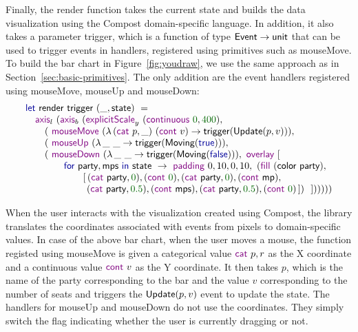 \documentclass{jfp}
\newcommand{\num}[1]{\textcolor{numclr}{#1}}
\newcommand{\ident}[1]{\textnormal{\textcolor{idclr}{\sffamily #1}}}
\newcommand{\kvd}[1]{\textnormal{\textcolor{kvdclr}{\sffamily #1}}}
\newcommand{\fkvd}[1]{\textnormal{\textcolor{fkvdclr}{\sffamily #1}}}
\begin{document}
Finally, the \ident{render} function takes the current state and builds the data visualization
using the Compost domain-specific language. In addition, it also takes a parameter \ident{trigger},
which is a function of type $\ident{Event}\rightarrow\ident{unit}$ that can be used to trigger
events in handlers, registered using primitives such as \kvd{mouseMove}.
To build the bar chart in Figure~\ref{fig:youdraw}, we use the same approach as in
Section~\ref{sec:basic-primitives}. The only addition are the event handlers registered using
\kvd{mouseMove}, \kvd{mouseUp} and \kvd{mouseDown}:
%
\begin{equation*}
\begin{array}{l}
\fkvd{let}~\ident{render}~\ident{trigger}~(\_, \ident{state})~=\\
\quad \kvd{axis}_l~(\kvd{axis}_b~(\kvd{explicitScale}_y~(\kvd{continuous}~\num{0},\num{400}),\\
\qquad (~\kvd{mouseMove}~(\lambda \,(\kvd{cat}~p,\_)~(\kvd{cont}~v)\rightarrow \ident{trigger}(\ident{Update}(p, v))),\\
\qquad (~\kvd{mouseUp}~(\lambda \,\_~\_\rightarrow \ident{trigger}(\ident{Moving}(\fkvd{true}))),\\
\qquad (~\kvd{mouseDown}~(\lambda \,\_~\_\rightarrow \ident{trigger}(\ident{Moving}(\fkvd{false}))),~\kvd{overlay}~[\\
\qquad \qquad \fkvd{for}~\ident{party}, \ident{mps}~\fkvd{in}~\ident{state}~\rightarrow~\kvd{padding}~0,10,0,10,~(\kvd{fill}~(\ident{color}~\ident{party}),\\
\qquad \qquad\quad\quad [\,(\kvd{cat}~\ident{party}, \num{0}), (\kvd{cont}~\num{0}), (\kvd{cat}~\ident{party}, \num{0}), (\kvd{cont}~\ident{mp}),\\
\qquad \qquad\quad\quad \hspace{0.38em}(\kvd{cat}~\ident{party}, \num{0.5}), (\kvd{cont}~\ident{mps}), (\kvd{cat}~\ident{party}, \num{0.5}), (\kvd{cont}~\num{0}) \,])~~])))))\\
\end{array}
\end{equation*}

\vspace{-0.5em}
\noindent
When the user interacts with the visualization created using Compost, the library
translates the coordinates associated with events from pixels to domain-specific
values. In case of the above bar chart, when the user moves a mouse, the function registed
using \kvd{mouseMove} is given a categorical value $\kvd{cat}~p, r$ as the X coordinate and
a continuous value $\kvd{cont}~v$ as the Y coordinate. It then takes $p$, which is the name
of the party corresponding to the bar and the value $v$ corresponding to the number of seats
and triggers the $\ident{Update}(p, v)$ event to update the state. The handlers for
\kvd{mouseUp} and \kvd{mouseDown} do not use the coordinates. They simply switch the flag
indicating whether the user is currently dragging or not.
\end{document}
